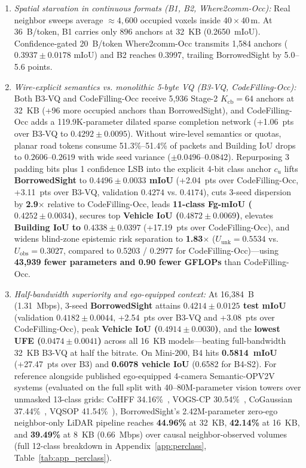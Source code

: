 \documentclass[journal]{IEEEtran}
\begin{document}
\begin{enumerate}
\item \textit{Spatial starvation in continuous formats (B1, B2, Where2comm-Occ):} Real neighbor sweeps average $\approx 4{,}600$ occupied voxels inside $40\times 40\,\mathrm{m}$. At 36~B/token, B1 carries only 896 anchors at 32~KB (0.2650~mIoU). Confidence-gated 20~B/token Where2comm-Occ transmits 1,584 anchors ($0.3937 \pm 0.0178$ mIoU) and B2 reaches 0.3997, trailing BorrowedSight by 5.0--5.6 points.
\item \textit{Wire-explicit semantics vs. monolithic 5-byte VQ (B3-VQ, CodeFilling-Occ):} Both B3-VQ and CodeFilling-Occ receive 5,936 Stage-2 $K_{\mathrm{cb}} = 64$ anchors at 32~KB (+96 more occupied anchors than BorrowedSight), and CodeFilling-Occ adds a 119.9K-parameter dilated sparse completion network (+1.06~pts over B3-VQ to $0.4292 \pm 0.0095$). Without wire-level semantics or quotas, planar road tokens consume 51.3\%--51.4\% of packets and Building IoU drops to $0.2606$--$0.2619$ with wide seed variance ($\pm 0.0496$--$0.0842$). Repurposing 3 padding bits plus 1 confidence LSB into the explicit 4-bit class anchor $c_u$ lifts \textbf{BorrowedSight} to \textbf{$0.4496 \pm 0.0033$ mIoU} (+2.04~pts over CodeFilling-Occ, +3.11~pts over B3-VQ, validation $0.4274$ vs. $0.4174$), cuts 3-seed dispersion by \textbf{2.9$\times$} relative to CodeFilling-Occ, leads \textbf{11-class Fg-mIoU ($0.4252 \pm 0.0034$)}, secures top \textbf{Vehicle IoU ($0.4872 \pm 0.0069$)}, elevates \textbf{Building IoU to $0.4338 \pm 0.0397$} (+17.19~pts over CodeFilling-Occ), and widens blind-zone epistemic risk separation to \textbf{1.83$\times$} ($U_{\mathrm{unk}} = 0.5534$ vs. $U_{\mathrm{obs}} = 0.3027$, compared to 0.5203 / 0.2977 for CodeFilling-Occ)---using \textbf{43,939 fewer parameters and 0.90 fewer GFLOPs} than CodeFilling-Occ.
\item \textit{Half-bandwidth superiority and ego-equipped context:} At 16,384~B (1.31~Mbps), 3-seed \textbf{BorrowedSight} attains \textbf{$0.4214 \pm 0.0125$ test mIoU} (validation \textbf{$0.4182 \pm 0.0044$}, +2.54~pts over B3-VQ and +3.08~pts over CodeFilling-Occ), peak \textbf{Vehicle IoU ($0.4914 \pm 0.0030$)}, and the \textbf{lowest UFE ($0.0474 \pm 0.0041$)} across all 16~KB models---beating full-bandwidth 32~KB B3-VQ at half the bitrate. On Mini-200, B4 hits \textbf{0.5814~mIoU} (+27.47~pts over B3) and \textbf{0.6078 vehicle IoU} (0.6582 for B4-S2). For reference alongside published ego-equipped 4-camera Semantic-OPV2V systems (evaluated on the full split with 40--80M-parameter vision towers over unmasked 13-class grids: CoHFF 34.16\%~\cite{song2024cohff}, VOGS-CP 30.54\%~\cite{chen2026vogscp}, CoGaussian 37.44\%~\cite{verma2026cogaussian}, VQSOP 41.54\%~\cite{li2026vqsop}), BorrowedSight's 2.42M-parameter zero-ego neighbor-only LiDAR pipeline reaches \textbf{44.96\%} at 32~KB, \textbf{42.14\%} at 16~KB, and \textbf{39.49\%} at 8~KB (0.66~Mbps) over causal neighbor-observed volumes (full 12-class breakdown in Appendix~\ref{app:perclass}, Table~\ref{tab:app_perclass}).
\end{enumerate}
\end{document}
